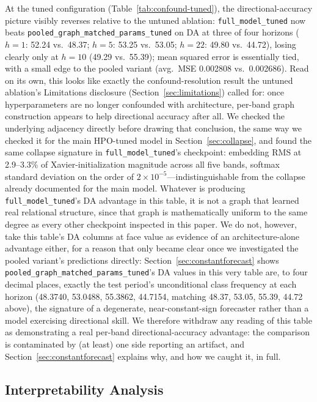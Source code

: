 \documentclass[journal]{IEEEtran}
\begin{document}
At the tuned configuration (Table~\ref{tab:confound-tuned}), the directional-accuracy picture visibly reverses relative to the untuned ablation: \texttt{full\_model\_tuned} now beats \texttt{pooled\_graph\_matched\_params\_tuned} on DA at three of four horizons ($h=1$: 52.24 vs.\ 48.37; $h=5$: 53.25 vs.\ 53.05; $h=22$: 49.80 vs.\ 44.72), losing clearly only at $h=10$ (49.29 vs.\ 55.39); mean squared error is essentially tied, with a small edge to the pooled variant (avg.\ MSE 0.002808 vs.\ 0.002686). Read on its own, this looks like exactly the confound-resolution result the untuned ablation's Limitations disclosure (Section~\ref{sec:limitations}) called for: once hyperparameters are no longer confounded with architecture, per-band graph construction appears to help directional accuracy after all. We checked the underlying adjacency directly before drawing that conclusion, the same way we checked it for the main HPO-tuned model in Section~\ref{sec:collapse}, and found the same collapse signature in \texttt{full\_model\_tuned}'s checkpoint: embedding RMS at 2.9--3.3\% of Xavier-initialization magnitude across all five bands, softmax standard deviation on the order of $2\times10^{-5}$---indistinguishable from the collapse already documented for the main model. Whatever is producing \texttt{full\_model\_tuned}'s DA advantage in this table, it is not a graph that learned real relational structure, since that graph is mathematically uniform to the same degree as every other checkpoint inspected in this paper. We do not, however, take this table's DA columns at face value as evidence of an architecture-alone advantage either, for a reason that only became clear once we investigated the pooled variant's predictions directly: Section~\ref{sec:constantforecast} shows \texttt{pooled\_graph\_matched\_params\_tuned}'s DA values in this very table are, to four decimal places, exactly the test period's unconditional class frequency at each horizon (48.3740, 53.0488, 55.3862, 44.7154, matching 48.37, 53.05, 55.39, 44.72 above), the signature of a degenerate, near-constant-sign forecaster rather than a model exercising directional skill. We therefore withdraw any reading of this table as demonstrating a real per-band directional-accuracy advantage: the comparison is contaminated by (at least) one side reporting an artifact, and Section~\ref{sec:constantforecast} explains why, and how we caught it, in full.

\subsection{Interpretability Analysis}
\end{document}
